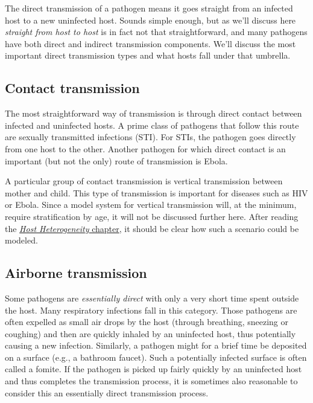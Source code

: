 \documentclass[]{article}
\theoremstyle{definition}
\theoremstyle{definition}
\theoremstyle{definition}
\theoremstyle{remark}
\begin{document}
The direct transmission of a pathogen means it goes straight from an
infected host to a new uninfected host. Sounds simple enough, but as
we'll discuss here \emph{straight from host to host} is in fact not that
straightforward, and many pathogens have both direct and indirect
transmission components. We'll discuss the most important direct
transmission types and what hosts fall under that umbrella.

\subsection{Contact transmission}\label{contact-transmission}

The most straightforward way of transmission is through direct contact
between infected and uninfected hosts. A prime class of pathogens that
follow this route are sexually transmitted infections (STI). For STIs,
the pathogen goes directly from one host to the other. Another pathogen
for which direct contact is an important (but not the only) route of
transmission is Ebola.

A particular group of contact transmission is vertical transmission
between mother and child. This type of transmission is important for
diseases such as HIV or Ebola. Since a model system for vertical
transmission will, at the minimum, require stratification by age, it
will not be discussed further here. After reading the \href{}{\emph{Host
Heterogeneity} chapter}, it should be clear how such a scenario could be
modeled.

\subsection{Airborne transmission}\label{airborne-transmission}

Some pathogens are \emph{essentially direct} with only a very short time
spent outside the host. Many respiratory infections fall in this
category. Those pathogens are often expelled as small air drops by the
host (through breathing, sneezing or coughing) and then are quickly
inhaled by an uninfected host, thus potentially causing a new infection.
Similarly, a pathogen might for a brief time be deposited on a surface
(e.g., a bathroom faucet). Such a potentially infected surface is often
called a fomite. If the pathogen is picked up fairly quickly by an
uninfected host and thus completes the transmission process, it is
sometimes also reasonable to consider this an essentially direct
transmission process.
\end{document}
